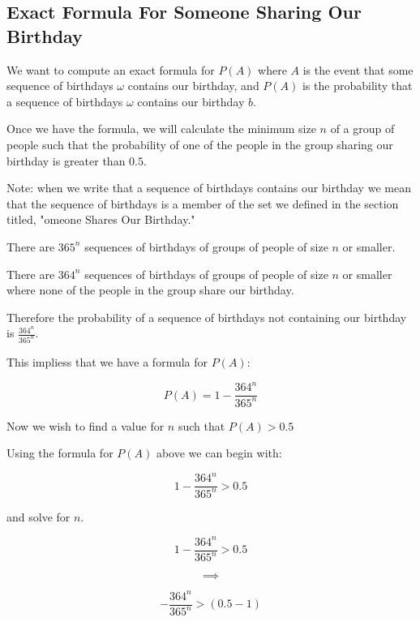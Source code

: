 \documentclass[a4paper,11pt]{article}
\begin{document}
\subsection{Exact Formula For Someone Sharing Our Birthday}
We want to compute an exact formula for $P\left( A \right)$ where
$A$ is the event that some sequence of birthdays $\omega$ contains
our birthday, and $P\left( A \right)$ is the probability that a
sequence of birthdays $\omega$ contains our birthday $b$.

Once we have the formula, we will calculate the minimum size $n$
of a group of people such that the probability of one of the 
people in the group sharing our birthday is greater than $0.5$.

Note: when we write that a sequence of birthdays contains our birthday
we mean that the sequence of birthdays is a member of the set we
defined in the section titled, "omeone Shares Our Birthday."

There are $365^{n}$ sequences of birthdays of groups of people of size
$n$ or smaller.

There are $364^{n}$ sequences of birthdays of groups of people of
size $n$ or smaller where none of the people in the group share our
birthday.

Therefore the probability of a sequence of birthdays not containing
our birthday is $\frac{364^{n}}{365^{n}}$.

This impliess that we have a formula for $P \left( A \right)$:

\begin{equation}
  P\left( A \right) = 1 - \frac{364^{n}}{365^{n}}
\end{equation}

Now we wish to find a value for $n$ such that $P\left( A \right) > 0.5$

Using the formula for $P\left( A \right)$ above we can begin with:

\begin{equation}
  1 - \frac{364^{n}}{365^{n}} > 0.5
\end{equation}

and solve for $n$.

\begin{equation}
  1 - \frac{364^{n}}{365^{n}} > 0.5
\end{equation}

\begin{equation}
\implies
\end{equation}

\begin{equation}
  - \frac{364^{n}}{365^{n}} > \left( 0.5 -1 \right)
\end{equation}

\printbibliography
\end{document}
